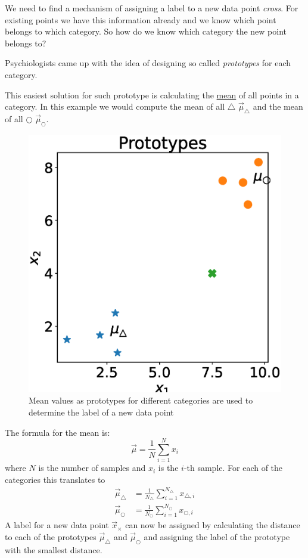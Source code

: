 We need to find a mechanism of assigning a label to a new data point \textit{cross}.
For existing points we have this information already and we know which point belongs to which category. 
So how do we know which category the new point belongs to?

Psychiologists came up with the idea of designing so called \textit{prototypes} for each category.

This easiest solution for such prototype is calculating the \underline{mean} of all points in a category.
In this example we would compute the mean of all $\bigtriangleup$ $\vec{\mu}_\bigtriangleup$ and the mean of all $\bigcirc$ $\vec{\mu}_\bigcirc$.
\begin{figure}[h]
  \centering
  \includegraphics[width=.75\textwidth]{images/prototypes_2.eps}
  \caption{Mean values as prototypes for different categories are used to determine the label of a new data point}
  \label{fig:prototypes_2}
\end{figure}

The formula for the mean is:
\begin{equation}
  \vec{\mu} = \frac{1}{N} \sum_{i=1}^{N} x_i
  \label{eq:mean}
\end{equation}
where $N$ is the number of samples and $x_i$ is the $i$-th sample.
For each of the categories this translates to
\begin{align}
  \vec{\mu}_\bigtriangleup &= \frac{1}{N_\bigtriangleup} \sum_{i=1}^{N_\bigtriangleup} x_{\bigtriangleup, i} \\
  \vec{\mu}_\bigcirc &= \frac{1}{N_\bigcirc} \sum_{i=1}^{N_\bigcirc} x_{\bigcirc, i}
\end{align}
A label for a new data point $\vec{x}_{\times}$ can now be assigned by calculating the distance to each of the prototypes $\vec{\mu}_{\bigtriangleup}$ and $\vec{\mu}_{\bigcirc}$ and assigning the label of the prototype with the smallest distance.

